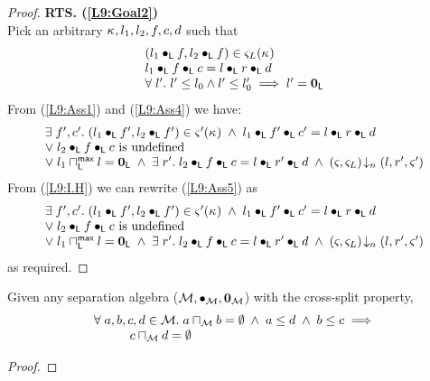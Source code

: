 \begin{lemma}[]
\begin{proof}
\noindent\textbf{RTS. (\ref{L9:Goal2})}\\
Pick an arbitrary $\kappa_{}, l_1, l_2, f, c, d$ such that
%
\begin{align}
	\begin{array}{l}
		(l_1 \bullet_{\textsf{L}} f, l_2 \bullet_{\textsf{L}} f) \in \varsigma_{L}(\kappa_{})\\
  	l_1 \bullet_{\textsf{L}} f \bullet_{\textsf{L}} c = l \bullet_{\textsf{L}} r \bullet_{\textsf{L}} d\\
  	\forall\; l'.\; l' \leq l_0 \land l' \leq l'_0 \implies l' = \mathbf{0}_{\textsf{L}}
	\end{array} \label{L9:Ass4}
\end{align}
%
From (\ref{L9:Ass1}) and (\ref{L9:Ass4}) we have:
%
\begin{align}
  \begin{array}{l}
  	\exists\; f', c'.\; (l_1 \bullet_{\textsf{L}} f', l_2 \bullet_{\textsf{L}} f') \in \varsigma_{}'(\kappa_{}) \;\land\; l_1 \bullet_{\textsf{L}} f' \bullet_{\textsf{L}} c' =  l \bullet_{\textsf{L}} r \bullet_{\textsf{L}} d\\
		\lor\;l_2 \bullet_{\textsf{L}} f \bullet_{\textsf{L}} c \text{ is undefined}\\
		\lor\; l_1 \sqcap_{\textsf{L}}^{\textsf{max}} l = \mathbf{0}_{\textsf{L}} \;\land\; \exists\; r'.\; l_2 \bullet_{\textsf{L}} f \bullet_{\textsf{L}} c = l \bullet_{\textsf{L}} r' \bullet_{\textsf{L}} d \;\land\; \left(\varsigma_{}, \varsigma_{L}\right) \!\downarrow_{n} \left(l, r', \varsigma_{}'\right)
  \end{array}\label{L9:Ass5}
\end{align}
%
From (\ref{L9:I.H}) we can rewrite (\ref{L9:Ass5}) as
%
\begin{align}
	\begin{array}{l}
  	\exists\; f', c'.\; (l_1 \bullet_{\textsf{L}} f', l_2 \bullet_{\textsf{L}} f') \in \varsigma_{}'(\kappa_{}) \;\land\; l_1 \bullet_{\textsf{L}} f' \bullet_{\textsf{L}} c' =  l \bullet_{\textsf{L}} r \bullet_{\textsf{L}} d\\
		\lor\;l_2 \bullet_{\textsf{L}} f \bullet_{\textsf{L}} c \text{ is undefined}\\
		\lor\; l_1 \sqcap_{\textsf{L}}^{\textsf{max}} l = \mathbf{0}_{\textsf{L}} \;\land\; \exists\; r'.\; l_2 \bullet_{\textsf{L}} f \bullet_{\textsf{L}} c = l \bullet_{\textsf{L}} r' \bullet_{\textsf{L}} d \;\land\; \left(\varsigma_{}, \varsigma_{L}\right) \!\downarrow_{n} \left(l, r', \varsigma_{}'\right)
  \end{array} \nonumber
\end{align}
%
as required.
\end{proof}
\end{lemma}
%
%
\begin{lemma}[]\label{lem:noMeetByOrder}
Given any separation algebra ($\mathcal{M}, \bullet_{\mathcal{M}}, \mathbf{0}_{\mathcal{M}}$) with the cross-split property,
\[
\begin{array}{l}
	\forall\; a, b, c, d \in \mathcal{M}.\; a \sqcap_{\mathcal{M}} b = \emptyset \;\land\; a \leq d \;\land\; b \leq c \implies \\
	\hspace*{1cm} c \sqcap_{\mathcal{M}} d = \emptyset
\end{array}
\]
%
\begin{proof}
\todo
\end{proof}
\end{lemma}
%
%


